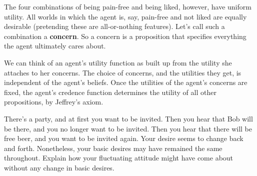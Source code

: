 The four combinations of being pain-free and being liked, however,
have uniform utility. All worlds in which the agent is, say, pain-free
and not liked are equally desirable (pretending these are
all-or-nothing features). Let's call such a combination a
\textbf{concern}. So a concern is a proposition that specifies
everything the agent ultimately cares about.

We can think of an agent's utility function as built up from the
utility she attaches to her concerns. The choice of concerns, and the
utilities they get, is independent of the agent's beliefs. Once the
utilities of the agent's concerns are fixed, the agent's credence
function determines the utility of all other propositions, by
Jeffrey's axiom.

\begin{exercise2}
  There's a party, and at first you want to be invited. Then you hear that Bob
  will be there, and you no longer want to be invited. Then you hear that
  there will be free beer, and you want to be invited again. Your desire seems
  to change back and forth. Nonetheless, your basic desires may have
  remained the same throughout. Explain how your fluctuating attitude
  might have come about without any change in basic desires.
\end{exercise2}



